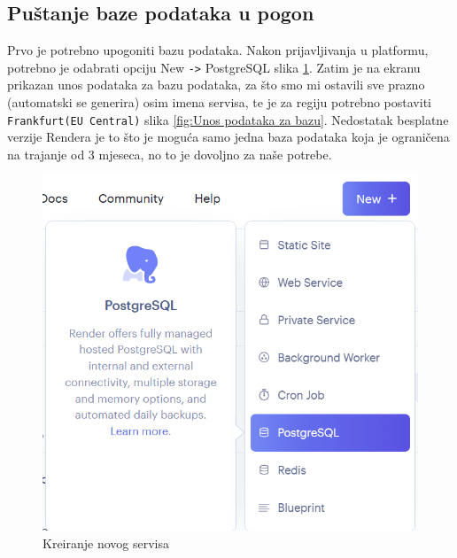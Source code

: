 			\subsection{Puštanje baze podataka u pogon} 
			Prvo je potrebno upogoniti bazu podataka. Nakon prijavljivanja u platformu, potrebno je odabrati opciju New \texttt{->} PostgreSQL slika \ref{fig:Kreiranjenovogservisa}. 
			Zatim je na ekranu prikazan unos podataka za bazu podataka, za što smo mi ostavili sve prazno (automatski se generira) osim imena servisa, te je za regiju potrebno postaviti \texttt{Frankfurt(EU Central)} slika \ref{fig:Unos podataka za bazu}.
			Nedostatak besplatne verzije Rendera je to što je moguća samo jedna baza podataka koja je ograničena na trajanje od 3 mjeseca, no to je dovoljno za naše potrebe.
			\begin{figure}[H]
				\includegraphics[scale=0.60]{slike/render1.png} %
				\centering
				\caption{Kreiranje novog servisa}
				\label{fig:Kreiranjenovogservisa}
			\end{figure}

